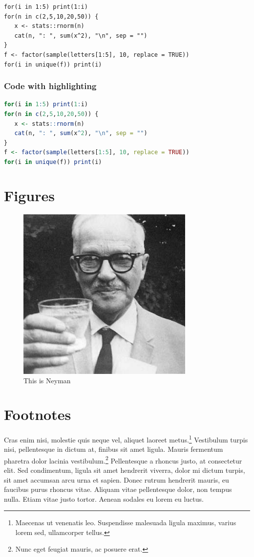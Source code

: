 \documentclass{article}
\begin{document}
\begin{lstlisting}
for(i in 1:5) print(1:i)
for(n in c(2,5,10,20,50)) {
   x <- stats::rnorm(n)
   cat(n, ": ", sum(x^2), "\n", sep = "")
}
f <- factor(sample(letters[1:5], 10, replace = TRUE))
for(i in unique(f)) print(i)
\end{lstlisting}

\subsubsection{Code with highlighting}

\begin{lstlisting}[language=R]
for(i in 1:5) print(1:i)
for(n in c(2,5,10,20,50)) {
   x <- stats::rnorm(n)
   cat(n, ": ", sum(x^2), "\n", sep = "")
}
f <- factor(sample(letters[1:5], 10, replace = TRUE))
for(i in unique(f)) print(i)
\end{lstlisting}

\section{Figures}

\begin{figure}
\centering
\includegraphics{example-latex/neyman.jpg}
\caption{This is Neyman}
\end{figure}

\section{Footnotes}

Cras enim nisi, molestie quis neque vel, aliquet laoreet
metus.\footnote{Maecenas ut venenatis leo. Suspendisse malesuada ligula
  maximus, varius lorem sed, ullamcorper tellus.} Vestibulum turpis
nisi, pellentesque in dictum at, finibus sit amet ligula. Mauris
fermentum pharetra dolor lacinia vestibulum.\footnote{Nunc eget feugiat
  mauris, ac posuere erat.} Pellentesque a rhoncus justo, at consectetur
elit. Sed condimentum, ligula sit amet hendrerit viverra, dolor mi
dictum turpis, sit amet accumsan arcu urna et sapien. Donec rutrum
hendrerit mauris, eu faucibus purus rhoncus vitae. Aliquam vitae
pellentesque dolor, non tempus nulla. Etiam vitae justo tortor. Aenean
sodales eu lorem eu luctus.
\end{document}
